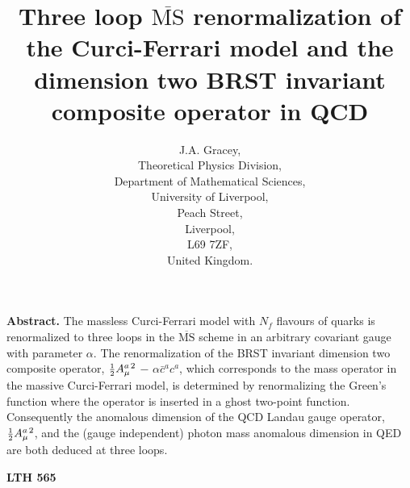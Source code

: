 \documentclass[a4paper,11pt]{article}
\newcommand{\half}{\mbox{\small{$\frac{1}{2}$}}}
\newcommand{\Nf}{N_{\!f}}
\newcommand{\MSbar}{\overline{\mbox{MS}}}
\begin{document}
\title{Three loop $\MSbar$ renormalization of the Curci-Ferrari model and the 
dimension two BRST invariant composite operator in QCD} 
\author{J.A. Gracey, \\ Theoretical Physics Division, \\ 
Department of Mathematical Sciences, \\ University of Liverpool, \\ Peach 
Street, \\ Liverpool, \\ L69 7ZF, \\ United Kingdom.} 
\date{} 
\maketitle 
\vspace{5cm} 
\noindent 
{\bf Abstract.} The massless Curci-Ferrari model with $\Nf$ flavours of quarks 
is renormalized to three loops in the $\MSbar$ scheme in an arbitrary covariant
gauge with parameter $\alpha$. The renormalization of the BRST invariant 
dimension two composite operator, $\half A^{a\,2}_\mu$ $-$ $\alpha \bar{c}^a
c^a$, which corresponds to the mass operator in the massive Curci-Ferrari 
model, is determined by renormalizing the Green's function where the operator 
is inserted in a ghost two-point function. Consequently the anomalous dimension
of the QCD Landau gauge operator, $\half A^{a\,2}_\mu$, and the (gauge 
independent) photon mass anomalous dimension in QED are both deduced at three 
loops. 

\vspace{-17.5cm}
\hspace{13.5cm}
{\bf LTH 565}
\end{document}
